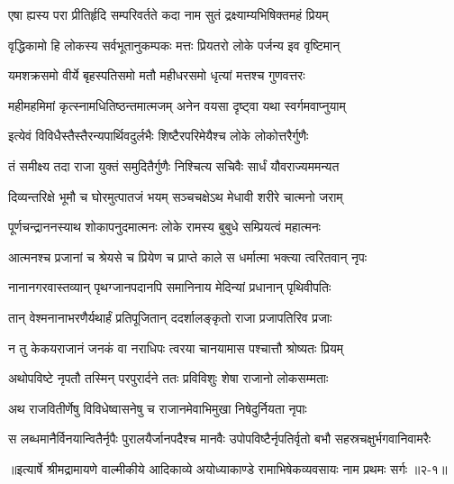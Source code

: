 \twolineshloka
{एषा ह्यस्य परा प्रीतिर्हृदि सम्परिवर्तते}
{कदा नाम सुतं द्रक्ष्याम्यभिषिक्तमहं प्रियम्} %

\twolineshloka
{वृद्धिकामो हि लोकस्य सर्वभूतानुकम्पकः}
{मत्तः प्रियतरो लोके पर्जन्य इव वृष्टिमान्} %

\twolineshloka
{यमशक्रसमो वीर्ये बृहस्पतिसमो मतौ}
{महीधरसमो धृत्यां मत्तश्च गुणवत्तरः} %

\twolineshloka
{महीमहमिमां कृत्स्नामधितिष्ठन्तमात्मजम्}
{अनेन वयसा दृष्ट्वा यथा स्वर्गमवाप्नुयाम्} %

\twolineshloka
{इत्येवं विविधैस्तैस्तैरन्यपार्थिवदुर्लभैः}
{शिष्टैरपरिमेयैश्च लोके लोकोत्तरैर्गुणैः} %

\twolineshloka
{तं समीक्ष्य तदा राजा युक्तं समुदितैर्गुणैः}
{निश्चित्य सचिवैः सार्धं यौवराज्यममन्यत} %

\twolineshloka
{दिव्यन्तरिक्षे भूमौ च घोरमुत्पातजं भयम्}
{सञ्चचक्षेऽथ मेधावी शरीरे चात्मनो जराम्} %

\twolineshloka
{पूर्णचन्द्राननस्याथ शोकापनुदमात्मनः}
{लोके रामस्य बुबुधे सम्प्रियत्वं महात्मनः} %

\twolineshloka
{आत्मनश्च प्रजानां च श्रेयसे च प्रियेण च}
{प्राप्ते काले स धर्मात्मा भक्त्या त्वरितवान् नृपः} %

\twolineshloka
{नानानगरवास्तव्यान् पृथग्जानपदानपि}
{समानिनाय मेदिन्यां प्रधानान् पृथिवीपतिः} %

\twolineshloka
{तान् वेश्मनानाभरणैर्यथार्हं प्रतिपूजितान्}
{ददर्शालङ्कृतो राजा प्रजापतिरिव प्रजाः} %

\twolineshloka
{न तु केकयराजानं जनकं वा नराधिपः}
{त्वरया चानयामास पश्चात्तौ श्रोष्यतः प्रियम्} %

\twolineshloka
{अथोपविष्टे नृपतौ तस्मिन् परपुरार्दने}
{ततः प्रविविशुः शेषा राजानो लोकसम्मताः} %

\twolineshloka
{अथ राजवितीर्णेषु विविधेष्वासनेषु च}
{राजानमेवाभिमुखा निषेदुर्नियता नृपाः} %

\twolineshloka
{स लब्धमानैर्विनयान्वितैर्नृपैः पुरालयैर्जानपदैश्च मानवैः}
{उपोपविष्टैर्नृपतिर्वृतो बभौ सहस्रचक्षुर्भगवानिवामरैः} %


॥इत्यार्षे श्रीमद्रामायणे वाल्मीकीये आदिकाव्ये अयोध्याकाण्डे रामाभिषेकव्यवसायः नाम प्रथमः सर्गः ॥२-१॥
